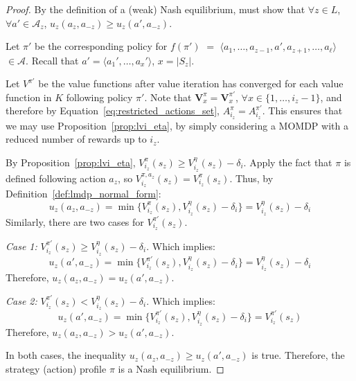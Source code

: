 \begin{proof}
By the definition of a (weak) Nash equilibrium, must show that $\forall z \in L$, $\forall a' \in \mathcal{A}_z$, $u_z(a_z, a_{-z}) \geq u_z(a', a_{-z})$.

Let $\pi'$ be the corresponding policy for $f(\pi')$ $=$ $\langle a_1, \ldots, a_{z-1}, a', a_{z+1}, \ldots, a_\ell \rangle$ $\in \mathcal{A}$. Recall that $a' = \langle a_1', \ldots, a_x' \rangle$, $x = |S_z|$.

Let $V^{\pi'}$ be the value functions after value iteration has converged for each value function in $K$ following policy $\pi'$. Note that $\mathbf{V}_x^\pi = \mathbf{V}_x^{\pi'}$, $\forall x \in \{1, \ldots, i_z - 1\}$, and therefore by Equation~\ref{eq:restricted_actions_set}, $A_{i_z}^\pi = A_{i_z}^{\pi'}$. This ensures that we may use Proposition~\ref{prop:lvi_eta}, by simply considering a MOMDP with a reduced number of rewards up to $i_z$.

By Proposition~\ref{prop:lvi_eta}, $V_{i_z}^\pi (s_z) \geq V_{i_z}^\eta (s_z) - \delta_i$. Apply the fact that $\pi$ is defined following action $a_z$, so $V_{i_z}^{\pi, a_z} (s_z) = V_{i_z}^\pi (s_z)$. Thus, by Definition~\ref{def:lmdp_normal_form}:
\begin{equation*}
    u_z(a_z, a_{-z}) = \min \{ V_{i_z}^\pi (s_z), V_{i_z}^\eta (s_z) - \delta_i \} = V_{i_z}^\eta (s_z) - \delta_i
\end{equation*}
Similarly, there are two cases for $V_{i_z}^{\pi'} (s_z)$.

\emph{Case 1:} $V_{i_z}^{\pi'} (s_z) \geq V_{i_z}^\eta (s_z) - \delta_i$. Which implies:
\begin{equation*}
    u_z(a', a_{-z}) = \min \{ V_{i_z}^{\pi'} (s_z), V_{i_z}^\eta (s_z) - \delta_i \} = V_{i_z}^\eta (s_z) - \delta_i
\end{equation*}
Therefore, $u_z(a_z, a_{-z}) = u_z(a', a_{-z})$.

\emph{Case 2:} $V_{i_z}^{\pi'} (s_z) < V_{i_z}^\eta (s_z) - \delta_i$. Which implies:
\begin{equation*}
    u_z(a', a_{-z}) = \min \{ V_{i_z}^{\pi'} (s_z), V_{i_z}^\eta (s_z) - \delta_i \} = V_{i_z}^{\pi'} (s_z)
\end{equation*}
Therefore, $u_z(a_z, a_{-z}) > u_z(a', a_{-z})$.

In both cases, the inequality $u_z(a_z, a_{-z}) \geq u_z(a', a_{-z})$ is true. Therefore, the strategy (action) profile $\pi$ is a Nash equilibrium.

\end{proof}

